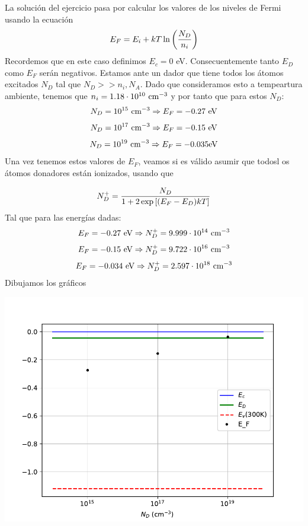 La solución del ejercicio pasa por calcular los valores de los niveles de Fermi usando la ecuación
\begin{equation}
	E_F = E_i + kT \ln \left( \frac{N_D}{n_i} \right)
\end{equation}
Recordemos que en este caso definimos $E_{c}=0$ eV. Consecuentemente tanto $E_D$ como $E_F$ serán negativos. Estamos ante un dador que tiene todos los átomos excitados $N_D$ tal que $N_D>>n_i,N_A$. Dado que consideramos esto a tempeartura ambiente, tenemos que $n_i=1.18\cdot 10^{10} \ \text{cm}^{-3}$ y por tanto que para estos $N_D$:
\begin{equation}
	N_D=10^{15} \ \text{cm}^{-3} \Rightarrow E_F = -0.27 \ \text{eV}
\end{equation}
\begin{equation}
	N_D=10^{17} \ \text{cm}^{-3} \Rightarrow E_F = -0.15  \ \text{eV}
\end{equation}
\begin{equation}
	N_D=10^{19} \ \text{cm}^{-3} \Rightarrow E_F = -0.035  \text{eV}
\end{equation}
Una vez tenemos estos valores de $E_F$, veamos si es válido asumir que todosl os átomos donadores están ionizados, usando que

\begin{equation}
	N_D^+ = \frac{N_D}{1+2\exp\left[ (E_F-E_D)kT \right]}
\end{equation}
Tal que para las energías dadas:
\begin{equation}
	E_F= -0.27  \ \text{eV} \Rightarrow N_D^+ =  9.999\cdot 10^{14}  \ \text{cm}^{-3}
\end{equation}
\begin{equation}
	E_F = -0.15 \ \text{eV}\Rightarrow N_D^+ =  9.722\cdot 10^{16} \ \text{cm}^{-3}
\end{equation}
\begin{equation}
	E_F =-0.034 \ \eV \Rightarrow N_D^+ = 2.597 \cdot 10^{18}  \ \cm^{-3}
\end{equation}
Dibujamos los gráficos
\begin{center}
	\includegraphics[width=0.9\linewidth]{Cuerpo/Ch_01/Ejercicio_01_8.pdf}
\end{center}



